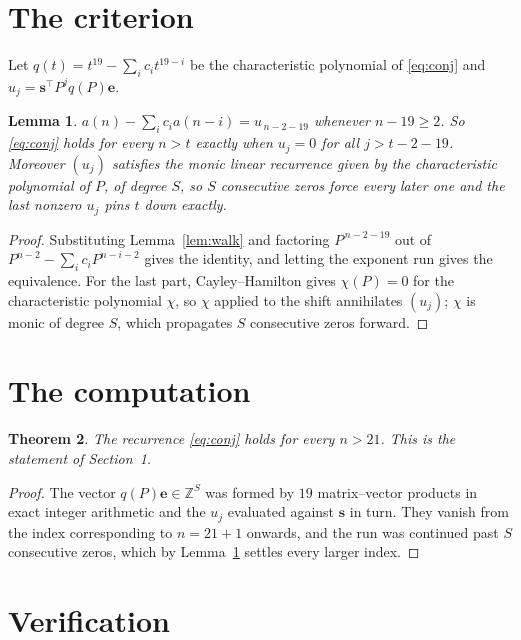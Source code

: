 \documentclass[11pt,a4paper]{article}
\theoremstyle{plain}
\newtheorem{theorem}{Theorem}
\newtheorem{lemma}[theorem]{Lemma}
\theoremstyle{definition}
\begin{document}
\section{The criterion}

Let $q(t)=t^{19}-\sum_i c_i t^{19-i}$ be the characteristic polynomial of
\eqref{eq:conj} and $u_j=\mathbf{s}^{\!\top}P^{j}q(P)\mathbf{e}$.

\begin{lemma}\label{lem:crit}
$a(n)-\sum_i c_i a(n-i)=u_{\,n-2-19}$ whenever $n-19\ge2$. So \eqref{eq:conj}
holds for every $n>t$ exactly when $u_j=0$ for all $j>t-2-19$. Moreover $(u_j)$
satisfies the monic linear recurrence given by the characteristic polynomial of $P$, of
degree $S$, so $S$ consecutive zeros force every later one and the last nonzero $u_j$ pins
$t$ down exactly.
\end{lemma}

\begin{proof}
Substituting Lemma~\ref{lem:walk} and factoring $P^{\,n-2-19}$ out of
$P^{n-2}-\sum_i c_i P^{n-i-2}$ gives the identity, and letting the exponent run gives the
equivalence. For the last part, Cayley--Hamilton gives $\chi(P)=0$ for the characteristic
polynomial $\chi$, so $\chi$ applied to the shift annihilates $(u_j)$; $\chi$ is monic of
degree $S$, which propagates $S$ consecutive zeros forward.
\end{proof}

\section{The computation}

\begin{theorem}
The recurrence \eqref{eq:conj} holds for every $n>21$. This is the statement of
Section~1.
\end{theorem}

\begin{proof}
The vector $q(P)\mathbf{e}\in\mathbb{Z}^{S}$ was formed by $19$ matrix--vector
products in exact integer arithmetic and the $u_j$ evaluated against $\mathbf{s}$ in turn.
They vanish from the index corresponding to $n=21+1$ onwards, and the run was continued
past $S$ consecutive zeros, which by Lemma~\ref{lem:crit} settles every larger index.
\end{proof}

\section{Verification}
\end{document}
